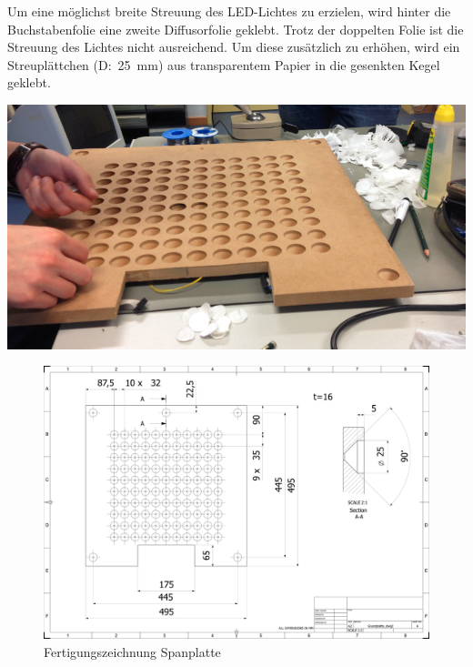 \begin{multicols}{2}
{}
Um eine möglichst breite Streuung des LED-Lichtes zu erzielen, wird hinter die Buchstabenfolie eine zweite Diffusorfolie  geklebt. Trotz der doppelten Folie ist die Streuung des Lichtes nicht ausreichend. Um diese zusätzlich zu erhöhen, wird ein Streuplättchen (D:~25~mm) aus transparentem Papier in die gesenkten Kegel geklebt. 

{
\centering\includegraphics[width=0.85\columnwidth]{Abbildungen/Konstruktion/LED02}

}



\end{multicols}

\begin{landscape}
	\begin{figure}
		\centering
		\includegraphics[width=21cm]{Abbildungen/Konstruktion/Grundplatte}
		\caption[Spanplatte]{Fertigungszeichnung Spanplatte}
		\label{fig:Spanplatte}
	\end{figure}
\end{landscape}


